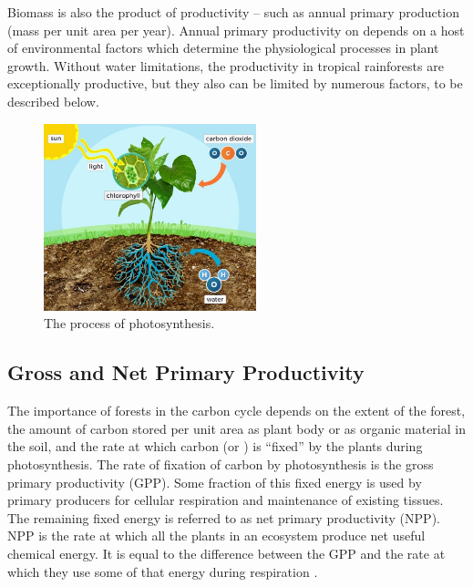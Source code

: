 Biomass is also the product of productivity -- such as annual primary production (mass per unit area per year). Annual primary productivity  on depends on a host of environmental factors which determine the physiological processes in plant growth. Without water limitations, the productivity in tropical rainforests are exceptionally productive, but they also can be limited by numerous factors, to be described below. 

  \begin{figure}[ht]
    \centering
        \includegraphics[width = 0.55\textwidth]{graphics/photosynthesis.jpg}
        \caption{The process of photosynthesis.}
    \end{figure}
    

\subsection{Gross and Net Primary Productivity}



The importance of forests in the carbon cycle depends on the extent of the forest, the amount of carbon stored per unit area as plant body or as organic material in the soil, and the rate at which carbon (or \CO) is ``fixed'' by the plants during photosynthesis. The rate of fixation of carbon by photosynthesis is the \gls{gross primary productivity} (GPP). Some fraction of this fixed energy is used by primary producers for cellular respiration and maintenance of existing tissues. The remaining fixed energy is referred to as \gls{net primary productivity} (NPP). NPP is the rate at which all the plants in an ecosystem produce net useful chemical energy. It is equal to the difference between the GPP and the rate at which they use some of that energy during respiration \citep{corlett2014ecology}. 

